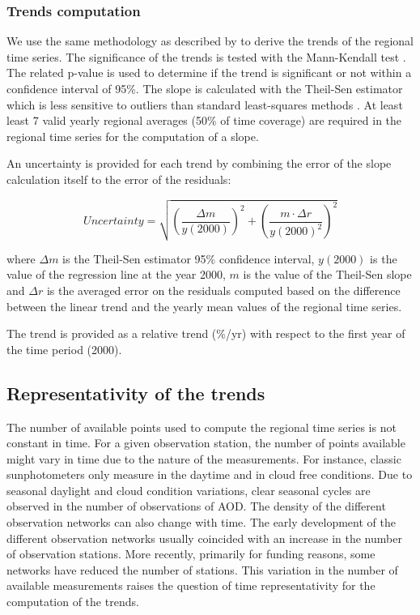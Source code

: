 \documentclass[acp, manuscript]{copernicus}
\begin{document}
\subsubsection{Trends computation}
We use the same methodology as described by \cite{aas2019global} to derive the trends of the regional time series. The significance of the trends is tested with the Mann-Kendall test \citep{hamed1998modified}. The related p-value is used to determine if the trend is significant or not within a confidence interval of 95\%. The slope is calculated with the Theil-Sen estimator which is less sensitive to outliers than standard least-squares methods \citep{sen1968estimates}. At least least 7 valid yearly regional averages (50\% of time coverage) are required in the regional time series for the computation of a slope.

An uncertainty is provided for each trend by combining the error of the slope calculation itself to the error of the residuals:

\begin{equation}
 Uncertainty = \sqrt{{\left (\frac{\Delta m}{y(2000)}\right )}^{2} + {\left ( \frac{m \cdot \Delta r}{y(2000)^2}\right )}^{2} }
\end{equation}

where $\Delta m$ is the Theil-Sen estimator 95\% confidence interval, $y(2000)$ is the value of the regression line at the year 2000, $m$ is the value of the Theil-Sen slope and $\Delta r$ is the averaged error on the residuals computed based on the difference between the linear trend and the yearly mean values of the regional time series.

The trend is provided as a relative trend (\%/yr) with respect to the first year of the time period (2000).

\subsection{Representativity of the trends}
The number of available points used to compute the regional time series is not constant in time. For a given observation station, the number of points available might vary in time due to the nature of the measurements. For instance, classic sunphotometers only measure in the daytime and in cloud free conditions. Due to seasonal daylight and cloud condition variations, clear seasonal cycles are observed in the number of observations of AOD. The density of the different observation networks can also change with time. The early development of the different observation networks usually coincided with an increase in the number of observation stations. More recently, primarily for funding reasons, some networks have reduced the number of stations. This variation in the number of available measurements raises the question of time representativity for the computation of the trends.
\end{document}
